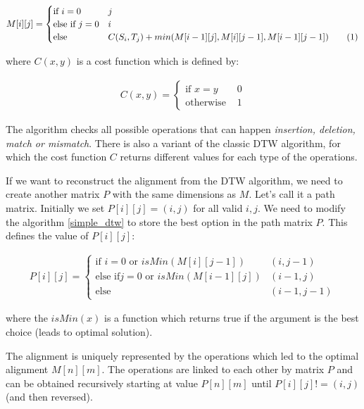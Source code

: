 \newcommand\numberthis{\addtocounter{equation}{1}\tag{\theequation}}
\begin{align*}
  M[i][j] = \begin{cases}
    \text{if }  i = 0 & j \\
    \text{else if }  j = 0 & i \\
    \text{else } & C(S_{i}, T_{j}) + min(M[i-1][j], M[i][j-1], M[i-1][j-1]) \numberthis \label{simple_dtw}
  \end{cases}
\end{align*}

where $C(x, y)$ is a cost function which is defined by:

\begin{align*}
  C(x,y) = \begin{cases}
      \text{if }  x = y & 0 \\
      \text{otherwise } & 1
  \end{cases}
\end{align*}

The algorithm checks all possible operations that can happen \textit{insertion, deletion, match or
mismatch}. There is also a variant of the classic DTW algorithm, for which the cost function $C$
returns different values for each type of the operations.

If we want to reconstruct the alignment from the DTW algorithm, we need to create another matrix $P$
with the same dimensions as $M$. Let's call it a path matrix. Initially we set $P[i][j] = (i,j)$ for
all valid $i, j$. We need to modify the algorithm \ref{simple_dtw} to store the best option in the
path matrix $P$. This defines the value of $P[i][j]$:

\begin{align*}
  P[i][j] = \begin{cases}
      \text{if }  i = 0 \text{ or } isMin(M[i][j-1]) & (i, j-1) \\
      \text{else if}  j = 0 \text{ or } isMin(M[i-1][j]) & (i-1, j) \\
      \text{else } & (i-1, j-1)
  \end{cases}
\end{align*}

where the $isMin(x)$ is a function which returns true if the argument is the best choice (leads to
optimal solution).

The alignment is uniquely represented by the operations which led to the optimal alignment
$M[n][m]$. The operations are linked to each other by matrix $P$ and can be obtained recursively
starting at value $P[n][m]$ until $P[i][j] != (i, j)$ (and then reversed).

